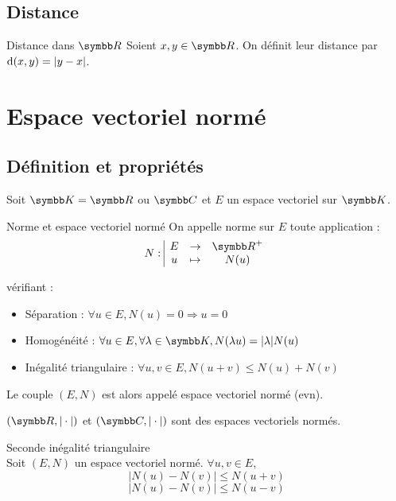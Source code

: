 \subsection{Distance}

\begin{definition}{Distance dans $\R$}{}
    Soient $x, y \in \R$. On définit leur distance par $\text d (x, y) = |y - x|$.
\end{definition}

\section{Espace vectoriel normé}
\subsection{Définition et propriétés}

Soit $\K = \R$ ou $\C$ et $E$ un espace vectoriel sur $\K$.

\begin{definition}{Norme et espace vectoriel normé}{}
    On appelle norme sur $E$ toute application :
    \[\fonction{N}{E}{\R^+}{u}{N(u)}\]

    vérifiant : 
    \begin{itemize}
        \item Séparation : $\forall u \in E, N(u) = 0 \Rightarrow u = 0$
        \item Homogénéité : $\forall u \in E, \forall \lambda \in \K, N(\lambda u) = |\lambda| N(u)$
        \item Inégalité triangulaire : $\forall u, v \in E, N(u + v) \leqslant N(u) + N(v)$
    \end{itemize}

    Le couple $(E, N)$ est alors appelé espace vectoriel normé (evn).
\end{definition}

\begin{exemple}
    $(\R, |\cdot|)$ et $(\C, |\cdot|)$ sont des espaces vectoriels normés.
\end{exemple}

\begin{proposition}{Seconde inégalité triangulaire}{}
    \\Soit $(E, N)$ un espace vectoriel normé. $\forall u, v \in E$,
    \[|N(u) - N(v)| \leqslant N(u + v)\]
    \[|N(u) - N(v)| \leqslant N(u - v)\]
\end{proposition}

